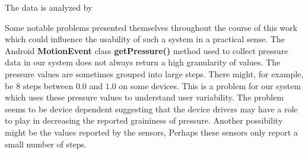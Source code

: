 


%


%


The data is analyzed by 

Some notable problems presented themselves
throughout the course of this work
which could influence the usability of such a 
system in a practical sense.
%
The Android \textbf{MotionEvent} class \textbf{getPressure()} method
used to collect pressure data in our system
does not always return a high granularity of values.
The pressure values are sometimes grouped
into large steps.
There might, for example,
be $8$ steps between $0.0$ and $1.0$ on some devices.
This is a problem for our system which uses
these pressure values to understand user variability.
%
The problem seems to be device dependent
suggesting that the device drivers may have a role to play
in decreasing the reported graininess of pressure.
Another possibility might be the values
reported by the sensors,
Perhaps these sensors only report a small number of steps.

